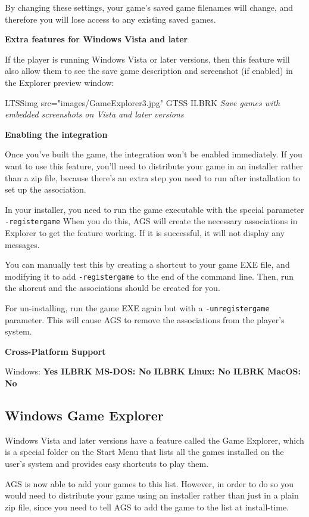 By changing these settings, your game's saved game filenames will change, and therefore
you will lose access to any existing saved games.

\bf{Extra features for Windows Vista and later}

If the player is running Windows Vista or later versions, then this feature will also allow them to see
the save game description and screenshot (if enabled) in the Explorer preview window:

LTSSimg src="images/GameExplorer3.jpg" GTSS ILBRK
\it{Save games with embedded screenshots on Vista and later versions}

\bf{Enabling the integration}

Once you've built the game, the integration won't be enabled immediately. If you want to
use this feature, you'll need to distribute your game in an installer rather than a zip
file, because there's an extra step you need to run after installation to set up the
association.

In your installer, you need to run the game executable with the special
parameter \verb$-registergame$  When you do this, AGS will create the necessary
associations in Explorer to get the feature working. If it is successful, it will
not display any messages.

You can manually test this by creating a shortcut to your game EXE file, and modifying
it to add \verb$-registergame$ to the end of the command line. Then, run the shorcut
and the associations should be created for you.

For un-installing, run the game EXE again but with a  \verb$-unregistergame$  parameter.
This will cause AGS to remove the associations from the player's system.

\bf{Cross-Platform Support}

Windows: \bf{ Yes }ILBRK
MS-DOS: \bf{ No }ILBRK
Linux: \bf{ No }ILBRK
MacOS: \bf{ No }


\subsection{Windows Game Explorer}\label{GameExplorer}%

Windows Vista and later versions have a feature called the Game Explorer, which is a special folder on
the Start Menu that lists all the games installed on the user's system and provides
easy shortcuts to play them.

AGS is now able to add your games to this list. However, in order to do so you
would need to distribute your game using an installer rather than just in a plain
zip file, since you need to tell AGS to add the game to the list at install-time.

